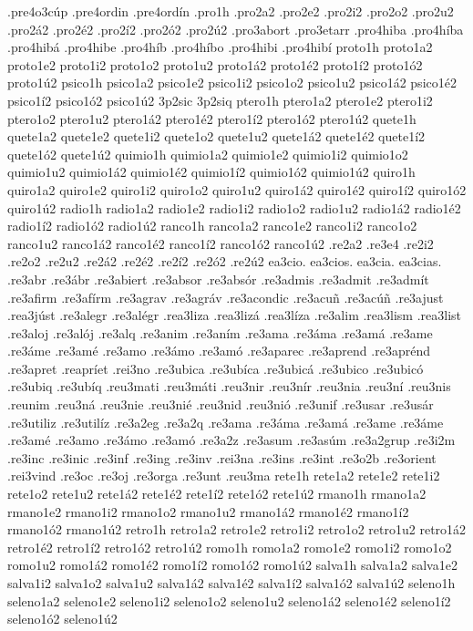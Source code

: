 {.pre4o3cúp
.pre4ordin
.pre4ordín
.pro1h
.pro2a2 .pro2e2 .pro2i2 .pro2o2 .pro2u2
.pro2á2 .pro2é2 .pro2í2 .pro2ó2 .pro2ú2
.pro3abort
.pro3etarr
.pro4hiba
.pro4híba
.pro4hibá
.pro4hibe
.pro4híb
.pro4híbo
.pro4hibi
.pro4hibí
proto1h
proto1a2 proto1e2 proto1i2 proto1o2 proto1u2
proto1á2 proto1é2 proto1í2 proto1ó2 proto1ú2
psico1h
psico1a2 psico1e2 psico1i2 psico1o2 psico1u2
psico1á2 psico1é2 psico1í2 psico1ó2 psico1ú2
3p2sic
3p2siq
ptero1h
ptero1a2 ptero1e2 ptero1i2 ptero1o2 ptero1u2
ptero1á2 ptero1é2 ptero1í2 ptero1ó2 ptero1ú2
quete1h
quete1a2 quete1e2 quete1i2 quete1o2 quete1u2
quete1á2 quete1é2 quete1í2 quete1ó2 quete1ú2
quimio1h
quimio1a2 quimio1e2 quimio1i2 quimio1o2 quimio1u2
quimio1á2 quimio1é2 quimio1í2 quimio1ó2 quimio1ú2
quiro1h
quiro1a2 quiro1e2 quiro1i2 quiro1o2 quiro1u2
quiro1á2 quiro1é2 quiro1í2 quiro1ó2 quiro1ú2
radio1h
radio1a2 radio1e2 radio1i2 radio1o2 radio1u2
radio1á2 radio1é2 radio1í2 radio1ó2 radio1ú2
ranco1h
ranco1a2 ranco1e2 ranco1i2 ranco1o2 ranco1u2
ranco1á2 ranco1é2 ranco1í2 ranco1ó2 ranco1ú2
.re2a2
.re3e4
.re2i2
.re2o2
.re2u2
.re2á2
.re2é2
.re2í2
.re2ó2
.re2ú2
ea3cio.
ea3cios.
ea3cia.
ea3cias.
.re3abr
.re3ábr
.re3abiert
.re3absor
.re3absór
.re3admis
.re3admit
.re3admít
.re3afirm
.re3afírm
.re3agrav
.re3agráv
.re3acondic
.re3acuñ
.re3acúñ
.re3ajust
.rea3júst
.re3alegr
.re3alégr
.rea3liza
.rea3lizá
.rea3líza
.re3alim
.rea3lism
.rea3list
.re3aloj
.re3alój
.re3alq
.re3anim
.re3aním
.re3ama
.re3áma
.re3amá
.re3ame
.re3áme
.re3amé
.re3amo
.re3ámo
.re3amó
.re3aparec
.re3aprend
.re3aprénd
.re3apret
.reapríet
.rei3no
.re3ubica
.re3ubíca
.re3ubicá
.re3ubico
.re3ubicó
.re3ubiq
.re3ubíq
.reu3mati
.reu3máti
.reu3nir
.reu3nír
.reu3nia
.reu3ní
.reu3nis
.reunim
.reu3ná
.reu3nie
.reu3nié
.reu3nid
.reu3nió
.re3unif
.re3usar
.re3usár
.re3utiliz
.re3utilíz
.re3a2eg
.re3a2q
.re3ama
.re3áma
.re3amá
.re3ame
.re3áme
.re3amé
.re3amo
.re3ámo
.re3amó
.re3a2z
.re3asum
.re3asúm
.re3a2grup
.re3i2m
.re3inc
.re3inic
.re3inf
.re3ing
.re3inv
.rei3na
.re3ins
.re3int
.re3o2b
.re3orient
.rei3vind
.re3oc
.re3oj
.re3orga
.re3unt
.reu3ma
rete1h
rete1a2 rete1e2 rete1i2 rete1o2 rete1u2
rete1á2 rete1é2 rete1í2 rete1ó2 rete1ú2
rmano1h
rmano1a2 rmano1e2 rmano1i2 rmano1o2 rmano1u2
rmano1á2 rmano1é2 rmano1í2 rmano1ó2 rmano1ú2
retro1h
retro1a2 retro1e2 retro1i2 retro1o2 retro1u2
retro1á2 retro1é2 retro1í2 retro1ó2 retro1ú2
romo1h
romo1a2 romo1e2 romo1i2 romo1o2 romo1u2
romo1á2 romo1é2 romo1í2 romo1ó2 romo1ú2
salva1h
salva1a2 salva1e2 salva1i2 salva1o2 salva1u2
salva1á2 salva1é2 salva1í2 salva1ó2 salva1ú2
seleno1h
seleno1a2 seleno1e2 seleno1i2 seleno1o2 seleno1u2
seleno1á2 seleno1é2 seleno1í2 seleno1ó2 seleno1ú2
}
